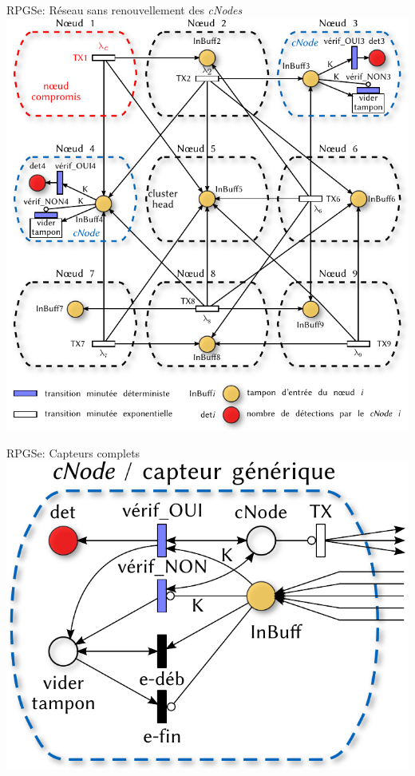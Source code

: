 \documentclass[aspectratio=43]{beamer} %
\newcommand\cns{\textit{cNodes}\xspace}
\begin{document}
\begin{frame}{RPGSe: Réseau sans renouvellement des \cns}
  \centering
  \includegraphics[height=.95\textheight]{Figs/RPSGe_network3x3_static.pdf}
\end{frame}
\begin{frame}{RPGSe: Capteurs complets}
  \centering
  \includegraphics[height=.5\textheight]{Figs/RPSGe_cNode_generic.pdf}
\end{frame}
\end{document}
